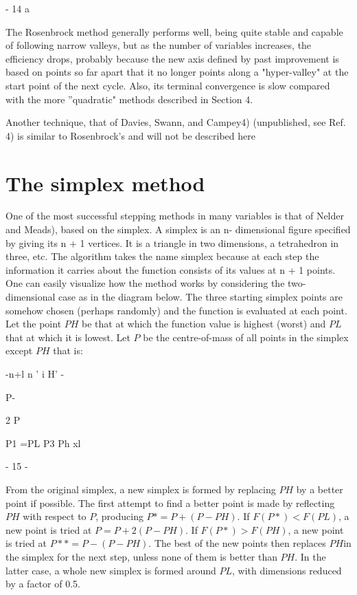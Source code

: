  
                                - 14 a
 
 
 
     The Rosenbrock method generally performs well, being quite stable
and capable of following narrow valleys, but as the number of variables
increases, the efficiency drops, probably because the new axis defined
by past improvement is based on points so far apart that it no longer
points along a "hyper-valley" at the start point of the next cycle.
Also, its terminal convergence is slow compared with the more
''quadratic" methods described in Section 4.
 
 
     Another technique, that of Davies, Swann, and Campey4) (unpublished,
see Ref. 4) is similar to Rosenbrock's and will not be described here
 
 
\section{The simplex method}
 
     One of the most successful stepping methods in many variables is
that of Nelder and Meads), based on the simplex.  A simplex is an n-
dimensional figure specified by giving its n + 1 vertices.  It is a
triangle in two dimensions, a tetrahedron in three, etc.  The algorithm
takes the name simplex because at each step the information it carries
about the function consists of its values at n + 1 points.  One can
easily visualize how the method works by considering the
two-dimensional
case as in the diagram below.  The three starting simplex points are
somehow  chosen (perhaps randomly) and the function is evaluated at each
point.  Let the point $PH$ be that at which the function value is highest
(worst) and $PL$ that at which it is lowest. Let $P$ be the centre-of-mass
of all points in the simplex except $PH$  that is:
 
 
                                 -n+l
                               n '   i    H' -
 
 
 
                                                                P-
 
 
 
                   2  P
 
 
                             P1 =PL
                   P3 Ph
                                             xl
 
 
                                 - 15 -
 
 
From the original simplex, a new simplex is formed by replacing $PH$ by
a better point if possible.  The first attempt to find a better point is
made by reflecting $PH$ with respect to $P$, producing
$P* = P + (P - PH)$.
If $F(P*) < F(PL)$, a new point is tried at $P   = P + 2(P - PH)$.  If
$F(P*) > F(PH)$, a new point is tried at $P** = P - (P - PH)$.  The best of
the new points then replaces $PH$in the simplex for the next step, unless
none of them is better than $PH$. In the latter case, a whole new simplex
is formed around $PL$, with dimensions reduced by a factor of 0.5.
 
